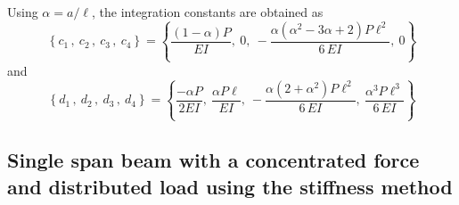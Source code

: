 \documentclass[11pt, oneside]{article}   	%
\begin{document}
Using $\alpha=a/\ell$, the integration constants are obtained as
\begin{equation}
   \left\{ 
    c_1 \,,~
    c_2 \,,~
    c_3 \,,~
    c_4 
   \right\}
   =
   \left\{
   	\frac{ (1-\alpha)  P}{{EI}},~
	0,~
	-\frac{ \alpha  \left(\alpha ^2-3 \alpha +2\right) P \ell^2 }{6 \,{EI}},~
   	0
   \right\}
   \label{B8}
\end{equation}
and
\begin{equation}
   \left\{ 
    d_1 \,,~
    d_2 \,,~
    d_3 \,,~
    d_4
   \right\}
   =
   \left\{
	\frac{ -\alpha  P}{2 {EI}},~
	\frac{\alpha  P \ell }{{EI}},~
	-\frac{ \alpha  \left(2+\alpha^2\right) P \ell^2 }{6 \,{EI}},~
	\frac{\alpha^3  P \ell^3}{6 \,{EI}}
   \right\}
   \label{B9}
\end{equation}
\begin{equation}
   \label{B10}
\end{equation}
\begin{equation}
   \label{B11}
\end{equation}
\begin{equation}
   \label{B12}
\end{equation}
\begin{equation}
   \label{B13}
\end{equation}
\begin{equation}
   \label{B14}
\end{equation}
\begin{equation}
   \label{B15}
\end{equation}
\begin{equation}
   \label{B16}
\end{equation}
\begin{equation}
   \label{B17}
\end{equation}
\begin{equation}
   \label{B18}
\end{equation}

\subsection{Single span beam with a concentrated force and distributed load using the stiffness method}
\end{document}
